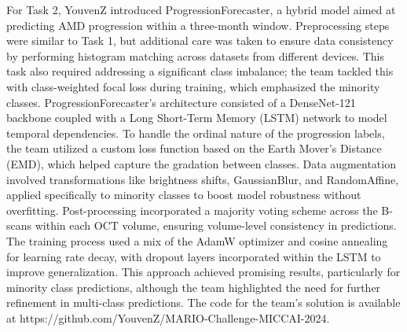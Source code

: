 \documentclass{article}
\begin{document}
For Task 2, YouvenZ introduced ProgressionForecaster, a hybrid model aimed at predicting AMD progression within a three-month window. Preprocessing steps were similar to Task 1, but additional care was taken to ensure data consistency by performing histogram matching across datasets from different devices. This task also required addressing a significant class imbalance; the team tackled this with class-weighted focal loss during training, which emphasized the minority classes.
ProgressionForecaster’s architecture consisted of a DenseNet-121 backbone coupled with a Long Short-Term Memory (LSTM) network to model temporal dependencies. To handle the ordinal nature of the progression labels, the team utilized a custom loss function based on the Earth Mover’s Distance (EMD), which helped capture the gradation between classes. Data augmentation involved transformations like brightness shifts, GaussianBlur, and RandomAffine, applied specifically to minority classes to boost model robustness without overfitting. Post-processing incorporated a majority voting scheme across the B-scans within each OCT volume, ensuring volume-level consistency in predictions.
The training process used a mix of the AdamW optimizer and cosine annealing for learning rate decay, with dropout layers incorporated within the LSTM to improve generalization. This approach achieved promising results, particularly for minority class predictions, although the team highlighted the need for further refinement in multi-class predictions. The code for the team’s solution is available at https://github.com/YouvenZ/MARIO-Challenge-MICCAI-2024.
\end{document}
